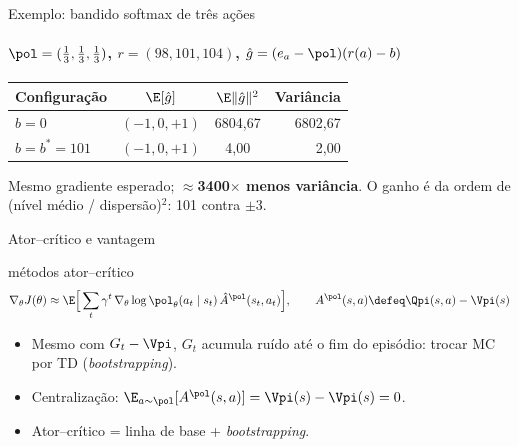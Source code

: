 \documentclass[aspectratio=169, 11pt]{beamer}
\newcommand{\ghat}{\hat{g}}
\newcommand{\Ahat}{\hat{A}}
\newcommand{\azul}[1]{{\color{rlAzulClaro}#1}}
\begin{document}
\begin{frame}{Exemplo: bandido softmax de três ações}
  \framesubtitle{$\pol = (\tfrac13,\tfrac13,\tfrac13)$, $r = (98,101,104)$, $\ghat = (e_a-\pol)(r(a)-b)$}

  \begin{center}\small
    \begin{tabular}{@{}lccr@{}}
      \toprule
      \textbf{Configuração} & $\E[\ghat]$ & $\E\|\ghat\|^2$ & \textbf{Variância} \\
      \midrule
      $b=0$   & $(-1,0,+1)$ & 6804,67 & {\color{rlLaranja}6802,67} \\
      $b=b^*=101$ & $(-1,0,+1)$ & 4,00    & \azul{2,00} \\
      \bottomrule
    \end{tabular}
  \end{center}

  \begin{ideiabox}
    Mesmo gradiente esperado; \textbf{$\approx$3400$\times$ menos variância}.
    O ganho é da ordem de (nível médio / dispersão)$^2$: 101 contra $\pm 3$.
  \end{ideiabox}
\end{frame}

\begin{frame}{Ator--crítico e vantagem}
  \begin{defbox}{métodos ator--crítico}
    \[
      \nabla_\theta J(\theta) \approx \E\Big[\sum_{t}\gamma^t\,
        \nabla_\theta\log\pol_\theta(a_t\mid s_t)\,\Ahat^{\pol}(s_t,a_t)\Big],
      \qquad
      A^{\pol}(s,a) \defeq \Qpi(s,a) - \Vpi(s)
    \]
  \end{defbox}
  \begin{itemize}\small
    \item Mesmo com $G_t - \Vpi$, $G_t$ acumula ruído até o fim do episódio: trocar MC por TD (\emph{bootstrapping}).
    \item Centralização: $\E_{a\sim\pol}[A^{\pol}(s,a)] = \Vpi(s)-\Vpi(s) = 0$.
    \item Ator--crítico = linha de base + \emph{bootstrapping}.
  \end{itemize}
\end{frame}
\end{document}
